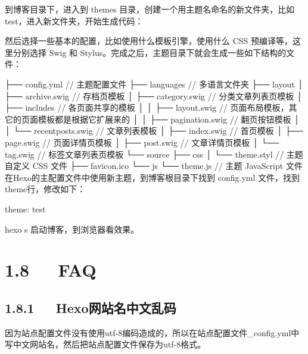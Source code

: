 \documentclass[letterpaper,12pt,english]{sphinxmanual}
\begin{document}
到博客目录下，进入到 themes 目录，创建一个用主题名命名的新文件夹，比如test，进入新文件夹，开始生成代码：

\begin{sphinxVerbatim}[commandchars=\\\{\}]
 
\end{sphinxVerbatim}

然后选择一些基本的配置，比如使用什么模板引擎，使用什么 CSS 预编译等，这里分别选择 Swig 和 Stylus。完成之后，主题目录下就会生成一些如下结构的文件：

\begin{sphinxVerbatim}[commandchars=\\\{\}]
├── \PYGZus{}config.yml // 主题配置文件
├── languages // 多语言文件夹
├── layout
│   ├── archive.swig // 存档页模板
│   ├── category.swig // 分类文章列表页模板
│   ├── includes // 各页面共享的模板
│   │   ├── layout.swig // 页面布局模板，其它的页面模板都是根据它扩展来的
│   │   ├── pagination.swig // 翻页按钮模板
│   │   └── recent\PYGZhy{}posts.swig // 文章列表模板
│   ├── index.swig // 首页模板
│   ├── page.swig // 页面详情页模板
│   ├── post.swig // 文章详情页模板
│   └── tag.swig // 标签文章列表页模板
└── source
    ├── css
    │   └── theme.styl // 主题自定义 CSS 文件
    ├── favicon.ico
    └── js
        └── theme.js // 主题 JavaScript 文件
在Hexo的主配置文件中使用新主题，到博客根目录下找到 \PYGZus{}config.yml 文件，找到theme行，修改如下：
\end{sphinxVerbatim}

theme: test

hexo s 启动博客，到浏览器看效果。


\section{1.8   FAQ}
\label{\detokenize{001software/001install/001._u7f51_u7ad9/hexo:faq}}

\subsection{1.8.1   Hexo网站名中文乱码}
\label{\detokenize{001software/001install/001._u7f51_u7ad9/hexo:id18}}
因为站点配置文件没有使用utf-8编码造成的，所以在站点配置文件\_config.yml中写中文网站名，然后把站点配置文件保存为utf-8格式。

\begin{sphinxVerbatim}[commandchars=\\\{\}]
 
 
\end{sphinxVerbatim}
\end{document}
